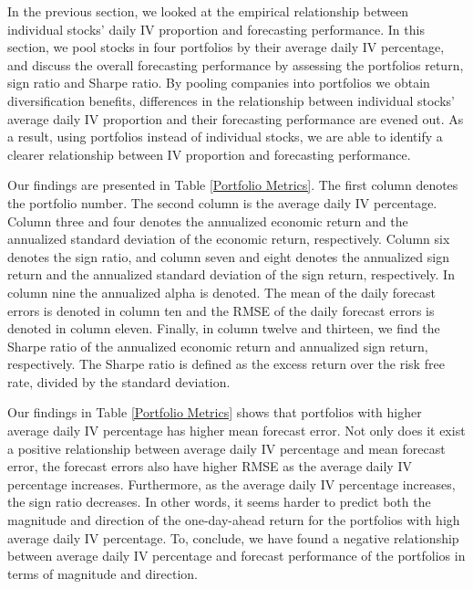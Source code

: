 In the previous section, we looked at the empirical relationship between individual stocks' daily IV proportion and forecasting performance. In this section, we pool stocks in four portfolios by their average daily IV percentage, and discuss the overall forecasting performance by assessing the portfolios return, sign ratio and Sharpe ratio. By pooling companies into portfolios we obtain diversification benefits, differences in the relationship between individual stocks' average daily IV proportion and their forecasting performance are evened out. As a result, using portfolios instead of individual stocks, we are able to identify a clearer relationship between IV proportion and forecasting performance. 

Our findings are presented in Table \ref{Portfolio Metrics}. The first column denotes the portfolio number. The second column is the average daily IV percentage. Column three and four denotes the annualized economic return and the annualized standard deviation of the economic return, respectively. Column six denotes the sign ratio, and column seven and eight denotes the annualized sign return and the annualized standard deviation of the sign return, respectively. In column nine the annualized alpha is denoted. The mean of the daily forecast errors is denoted in column ten and the RMSE of the daily forecast errors is denoted in column eleven. Finally, in column twelve and thirteen, we find the Sharpe ratio of the annualized economic return and annualized sign return, respectively. The Sharpe ratio is defined as the excess return over the risk free rate, divided by the standard deviation.

Our findings in Table \ref{Portfolio Metrics} shows that portfolios with higher average daily IV percentage has higher mean forecast error. Not only does it exist a positive relationship between average daily IV percentage and mean forecast error, the forecast errors also have higher RMSE as the average daily IV percentage increases. Furthermore, as the average daily IV percentage increases, the sign ratio decreases. In other words, it seems harder to predict both the magnitude and direction of the one-day-ahead return for the portfolios with high average daily IV percentage. To, conclude, we have found a negative relationship between average daily IV percentage and forecast performance of the portfolios in terms of magnitude and direction. 

